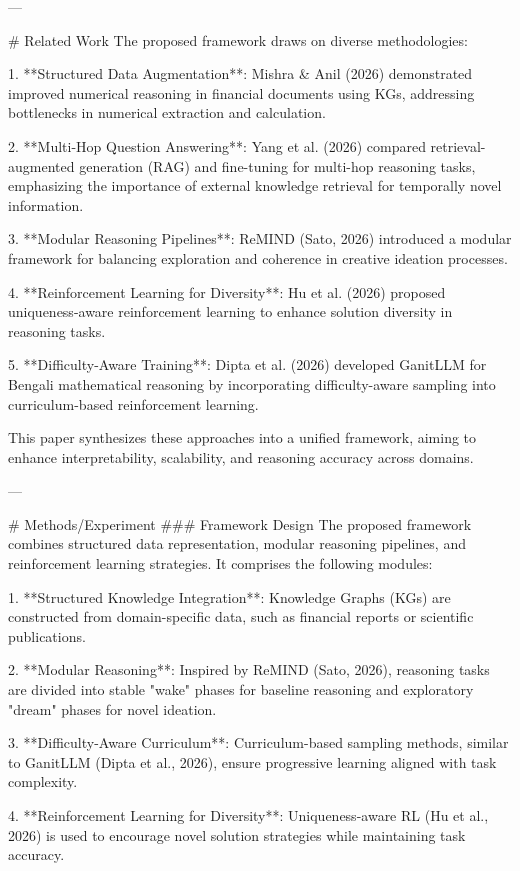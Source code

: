 ---

# Related Work  
The proposed framework draws on diverse methodologies:  

1. **Structured Data Augmentation**: Mishra & Anil (2026) demonstrated improved numerical reasoning in financial documents using KGs, addressing bottlenecks in numerical extraction and calculation.  

2. **Multi-Hop Question Answering**: Yang et al. (2026) compared retrieval-augmented generation (RAG) and fine-tuning for multi-hop reasoning tasks, emphasizing the importance of external knowledge retrieval for temporally novel information.  

3. **Modular Reasoning Pipelines**: ReMIND (Sato, 2026) introduced a modular framework for balancing exploration and coherence in creative ideation processes.  

4. **Reinforcement Learning for Diversity**: Hu et al. (2026) proposed uniqueness-aware reinforcement learning to enhance solution diversity in reasoning tasks.  

5. **Difficulty-Aware Training**: Dipta et al. (2026) developed GanitLLM for Bengali mathematical reasoning by incorporating difficulty-aware sampling into curriculum-based reinforcement learning.  

This paper synthesizes these approaches into a unified framework, aiming to enhance interpretability, scalability, and reasoning accuracy across domains.  

---

# Methods/Experiment  
### Framework Design  
The proposed framework combines structured data representation, modular reasoning pipelines, and reinforcement learning strategies. It comprises the following modules:  

1. **Structured Knowledge Integration**: Knowledge Graphs (KGs) are constructed from domain-specific data, such as financial reports or scientific publications.  

2. **Modular Reasoning**: Inspired by ReMIND (Sato, 2026), reasoning tasks are divided into stable "wake" phases for baseline reasoning and exploratory "dream" phases for novel ideation.  

3. **Difficulty-Aware Curriculum**: Curriculum-based sampling methods, similar to GanitLLM (Dipta et al., 2026), ensure progressive learning aligned with task complexity.  

4. **Reinforcement Learning for Diversity**: Uniqueness-aware RL (Hu et al., 2026) is used to encourage novel solution strategies while maintaining task accuracy.  

